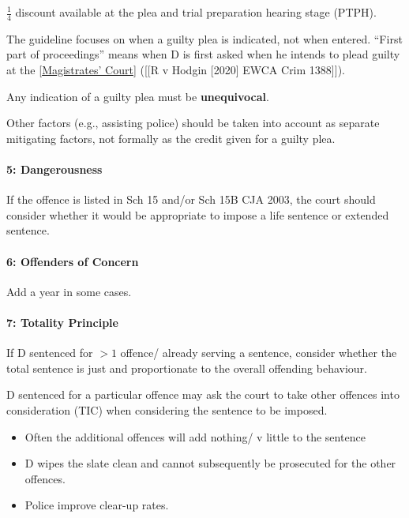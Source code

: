 \documentclass[
]{article}
\providecommand{\tightlist}{%
  \setlength{\itemsep}{0pt}\setlength{\parskip}{0pt}}
\begin{document}
\(\frac{1}{4}\) discount available at the plea and trial preparation
hearing stage (PTPH).

The guideline focuses on when a guilty plea is indicated, not when
entered. ``First part of proceedings'' means when D is first asked when
he intends to plead guilty at the
\href{maximum\%20compensation\%20of\%20£5,000\%20per\%20offence}{{[}Magistrates'
Court{]}} ({[}{[}R v Hodgin {[}2020{]} EWCA Crim 1388{]}{]}).

Any indication of a guilty plea must be \textbf{unequivocal}.

Other factors (e.g., assisting police) should be taken into account as
separate mitigating factors, not formally as the credit given for a
guilty plea.

\hypertarget{dangerousness}{%
\paragraph{5: Dangerousness}\label{dangerousness}}

If the offence is listed in Sch 15 and/or Sch 15B CJA 2003, the court
should consider whether it would be appropriate to impose a life
sentence or extended sentence.

\hypertarget{offenders-of-concern}{%
\paragraph{6: Offenders of Concern}\label{offenders-of-concern}}

Add a year in some cases.

\hypertarget{totality-principle}{%
\paragraph{7: Totality Principle}\label{totality-principle}}

If D sentenced for \(>1\) offence/ already serving a sentence, consider
whether the total sentence is just and proportionate to the overall
offending behaviour.

D sentenced for a particular offence may ask the court to take other
offences into consideration (TIC) when considering the sentence to be
imposed.

\begin{itemize}
\tightlist
\item
  Often the additional offences will add nothing/ v little to the
  sentence
\item
  D wipes the slate clean and cannot subsequently be prosecuted for the
  other offences.
\item
  Police improve clear-up rates.
\end{itemize}
\end{document}
